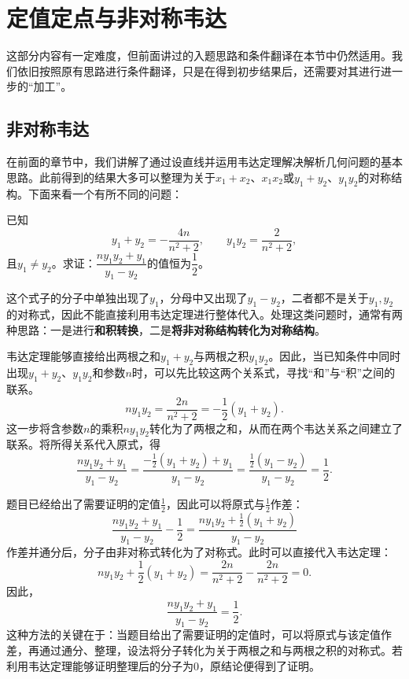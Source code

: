 \section{定值定点与非对称韦达}
这部分内容有一定难度，但前面讲过的入题思路和条件翻译在本节中仍然适用。我们依旧按照原有思路进行条件翻译，只是在得到初步结果后，还需要对其进行进一步的“加工”。


\subsection{非对称韦达}
在前面的章节中，我们讲解了通过设直线并运用韦达定理解决解析几何问题的基本思路。此前得到的结果大多可以整理为关于$x_1+x_2$、$x_1x_2$或$y_1+y_2$、$y_1y_2$的对称结构。下面来看一个有所不同的问题：
\begin{tcolorbox}[
  enhanced,
  breakable,
  title={问题引入},
  colback=structurecolor!5,
  colframe=structurecolor,
  colbacktitle=structurecolor,
  coltitle=white,
  fonttitle=\bfseries,
  boxrule=0.5pt,
  arc=1mm,
  left=8pt,
  right=8pt,
  top=6pt,
  bottom=6pt
]
已知
\[
y_1+y_2=-\frac{4n}{n^2+2},\qquad
y_1y_2=\frac{2}{n^2+2},
\]
且$y_1\neq y_2$。求证：$\dfrac{ny_1y_2+y_1}{y_1-y_2}$的值恒为$\dfrac{1}{2}$。
\end{tcolorbox}

这个式子的分子中单独出现了$y_1$，分母中又出现了$y_1-y_2$，二者都不是关于$y_1,y_2$的对称式，因此不能直接利用韦达定理进行整体代入。处理这类问题时，通常有两种思路：一是进行\textbf{和积转换}，二是\textbf{将非对称结构转化为对称结构}。

\medskip
{}

韦达定理能够直接给出两根之和$y_1+y_2$与两根之积$y_1y_2$。因此，当已知条件中同时出现$y_1+y_2$、$y_1y_2$和参数$n$时，可以先比较这两个关系式，寻找“和”与“积”之间的联系。
\[
ny_1y_2
=\frac{2n}{n^2+2}
=-\frac{1}{2}(y_1+y_2).
\]
这一步将含参数$n$的乘积$ny_1y_2$转化为了两根之和，从而在两个韦达关系之间建立了联系。将所得关系代入原式，得
\[
\frac{ny_1y_2+y_1}{y_1-y_2}=\frac{-\frac{1}{2}(y_1+y_2)+y_1}{y_1-y_2}=\frac{\frac{1}{2}(y_1-y_2)}{y_1-y_2}=\frac{1}{2}.
\]
\medskip
{}

题目已经给出了需要证明的定值$\frac{1}{2}$，因此可以将原式与$\frac{1}{2}$作差：
\[
\frac{ny_1y_2+y_1}{y_1-y_2}-\frac{1}{2}=\frac{ny_1y_2+\frac{1}{2}(y_1+y_2)}{y_1-y_2}
\]
作差并通分后，分子由非对称式转化为了对称式。此时可以直接代入韦达定理：
\[
ny_1y_2+\frac{1}{2}(y_1+y_2)
=\frac{2n}{n^2+2}
-\frac{2n}{n^2+2}
=0.
\]
因此，
\[
\frac{ny_1y_2+y_1}{y_1-y_2}=\frac{1}{2}.
\]
这种方法的关键在于：当题目给出了需要证明的定值时，可以将原式与该定值作差，再通过通分、整理，设法将分子转化为关于两根之和与两根之积的对称式。若利用韦达定理能够证明整理后的分子为$0$，原结论便得到了证明。

